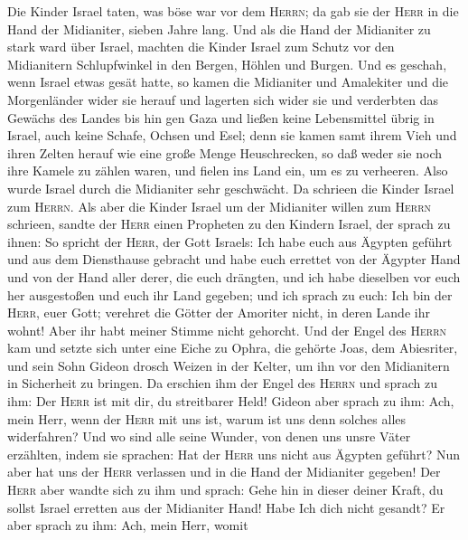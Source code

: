  Die Kinder Israel taten, was böse war vor dem
\textsc{Herrn}; da gab sie der \textsc{Herr} in die Hand der Midianiter,
sieben Jahre lang.  Und als die Hand der Midianiter zu
stark ward über Israel, machten die Kinder Israel zum Schutz vor den
Midianitern Schlupfwinkel in den Bergen, Höhlen und Burgen.
 Und es geschah, wenn Israel etwas gesät hatte, so kamen
die Midianiter und Amalekiter und die Morgenländer wider sie herauf
 und lagerten sich wider sie und verderbten das Gewächs
des Landes bis hin gen Gaza und ließen keine Lebensmittel übrig in
Israel, auch keine Schafe, Ochsen und Esel;  denn sie
kamen samt ihrem Vieh und ihren Zelten herauf wie eine große Menge
Heuschrecken, so daß weder sie noch ihre Kamele zu zählen waren, und
fielen ins Land ein, um es zu verheeren.  Also wurde
Israel durch die Midianiter sehr geschwächt. Da schrieen die Kinder
Israel zum \textsc{Herrn}.  Als aber die Kinder Israel um
der Midianiter willen zum \textsc{Herrn} schrieen,  sandte
der \textsc{Herr} einen Propheten zu den Kindern Israel, der sprach zu
ihnen: So spricht der \textsc{Herr}, der Gott Israels: Ich habe euch aus
Ägypten geführt und aus dem Diensthause gebracht  und habe
euch errettet von der Ägypter Hand und von der Hand aller derer, die
euch drängten, und ich habe dieselben vor euch her ausgestoßen und euch
ihr Land gegeben; und ich sprach zu euch:  Ich bin der
\textsc{Herr}, euer Gott; verehret die Götter der Amoriter nicht, in
deren Lande ihr wohnt! Aber ihr habt meiner Stimme nicht gehorcht.
 Und der Engel des \textsc{Herrn} kam und setzte sich
unter eine Eiche zu Ophra, die gehörte Joas, dem Abiesriter, und sein
Sohn Gideon drosch Weizen in der Kelter, um ihn vor den Midianitern in
Sicherheit zu bringen.  Da erschien ihm der Engel des
\textsc{Herrn} und sprach zu ihm: Der \textsc{Herr} ist mit dir, du
streitbarer Held!  Gideon aber sprach zu ihm: Ach, mein
Herr, wenn der \textsc{Herr} mit uns ist, warum ist uns denn solches
alles widerfahren? Und wo sind alle seine Wunder, von denen uns unsre
Väter erzählten, indem sie sprachen: Hat der \textsc{Herr} uns nicht aus
Ägypten geführt? Nun aber hat uns der \textsc{Herr} verlassen und in die
Hand der Midianiter gegeben!  Der \textsc{Herr} aber
wandte sich zu ihm und sprach: Gehe hin in dieser deiner Kraft, du
sollst Israel erretten aus der Midianiter Hand! Habe Ich dich nicht
gesandt?  Er aber sprach zu ihm: Ach, mein Herr, womit
